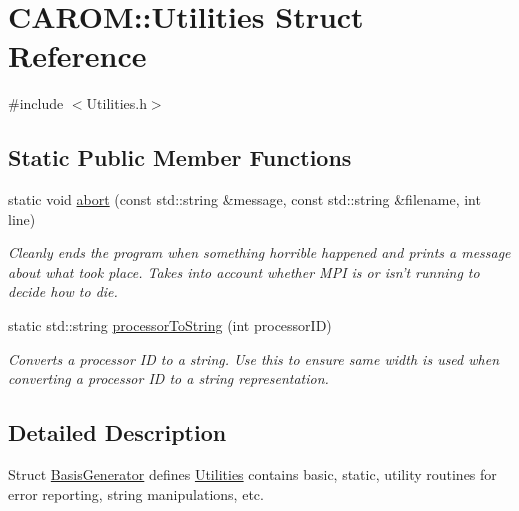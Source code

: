 \hypertarget{struct_c_a_r_o_m_1_1_utilities}{\section{C\-A\-R\-O\-M\-:\-:Utilities Struct Reference}
\label{struct_c_a_r_o_m_1_1_utilities}
}


{\ttfamily \#include $<$Utilities.\-h$>$}

\subsection*{Static Public Member Functions}
\begin{DoxyCompactItemize}
\item 
static void \hyperlink{struct_c_a_r_o_m_1_1_utilities_a9c48f5024b78376e1255fd647b6d7239}{abort} (const std\-::string \&message, const std\-::string \&filename, int line)
\begin{DoxyCompactList}\small\item\em Cleanly ends the program when something horrible happened and prints a message about what took place. Takes into account whether M\-P\-I is or isn't running to decide how to die. \end{DoxyCompactList}\item 
static std\-::string \hyperlink{struct_c_a_r_o_m_1_1_utilities_a1dd483f2124104a09b61a2f582b2766e}{processor\-To\-String} (int processor\-I\-D)
\begin{DoxyCompactList}\small\item\em Converts a processor I\-D to a string. Use this to ensure same width is used when converting a processor I\-D to a string representation. \end{DoxyCompactList}\end{DoxyCompactItemize}


\subsection{Detailed Description}
Struct \hyperlink{class_c_a_r_o_m_1_1_basis_generator}{Basis\-Generator} defines \hyperlink{struct_c_a_r_o_m_1_1_utilities}{Utilities} contains basic, static, utility routines for error reporting, string manipulations, etc. 

